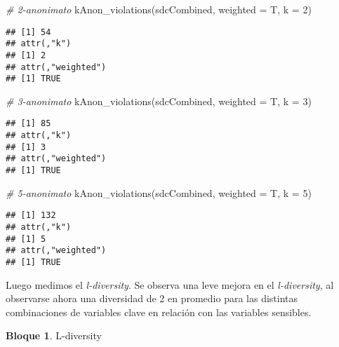 \documentclass[
]{book}
\newenvironment{Shaded}{\begin{snugshade}}{\end{snugshade}}
\newcommand{\AttributeTok}[1]{\textcolor[rgb]{0.77,0.63,0.00}{#1}}
\newcommand{\CommentTok}[1]{\textcolor[rgb]{0.56,0.35,0.01}{\textit{#1}}}
\newcommand{\ConstantTok}[1]{\textcolor[rgb]{0.00,0.00,0.00}{#1}}
\newcommand{\DecValTok}[1]{\textcolor[rgb]{0.00,0.00,0.81}{#1}}
\newcommand{\FunctionTok}[1]{\textcolor[rgb]{0.00,0.00,0.00}{#1}}
\newcommand{\NormalTok}[1]{#1}
\newcommand{\OtherTok}[1]{\textcolor[rgb]{0.56,0.35,0.01}{#1}}
\newcommand{\SpecialCharTok}[1]{\textcolor[rgb]{0.00,0.00,0.00}{#1}}
\theoremstyle{definition}
\theoremstyle{definition}
\newtheorem{example}{Bloque}[chapter]
\theoremstyle{definition}
\theoremstyle{definition}
\theoremstyle{remark}
\begin{document}
\begin{Shaded}
\begin{Highlighting}[]
\CommentTok{\# 2{-}anonimato}
\FunctionTok{kAnon\_violations}\NormalTok{(sdcCombined, }\AttributeTok{weighted =}\NormalTok{ T, }\AttributeTok{k =} \DecValTok{2}\NormalTok{) }
\end{Highlighting}
\end{Shaded}

\begin{verbatim}
## [1] 54
## attr(,"k")
## [1] 2
## attr(,"weighted")
## [1] TRUE
\end{verbatim}

\begin{Shaded}
\begin{Highlighting}[]
\CommentTok{\# 3{-}anonimato}
\FunctionTok{kAnon\_violations}\NormalTok{(sdcCombined, }\AttributeTok{weighted =}\NormalTok{ T, }\AttributeTok{k =} \DecValTok{3}\NormalTok{) }
\end{Highlighting}
\end{Shaded}

\begin{verbatim}
## [1] 85
## attr(,"k")
## [1] 3
## attr(,"weighted")
## [1] TRUE
\end{verbatim}

\begin{Shaded}
\begin{Highlighting}[]
\CommentTok{\# 5{-}anonimato}
\FunctionTok{kAnon\_violations}\NormalTok{(sdcCombined, }\AttributeTok{weighted =}\NormalTok{ T, }\AttributeTok{k =} \DecValTok{5}\NormalTok{) }
\end{Highlighting}
\end{Shaded}

\begin{verbatim}
## [1] 132
## attr(,"k")
## [1] 5
## attr(,"weighted")
## [1] TRUE
\end{verbatim}

Luego medimos el \emph{l-diversity}. Se observa una leve mejora en el \emph{l-diversity}, al observarse ahora una diversidad de 2 en promedio para las distintas combinaciones de variables clave en relación con las variables sensibles.

\begin{example}
\protect\hypertarget{exm:bloque63nbm}{}\label{exm:bloque63nbm}L-diversity
\end{example}

\begin{Shaded}
\end{Shaded}
\end{document}
